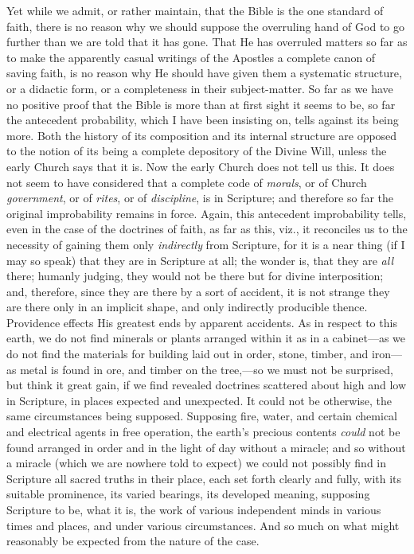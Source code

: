 Yet while we admit, or rather maintain, that the Bible is the one
standard of faith, there is no reason why we should suppose the
overruling hand of God to go further than we are told that it has
gone. That He has overruled matters so far as to make the apparently
casual writings of the Apostles a complete canon of saving faith, is
no reason why He should have given them a systematic structure, or a
didactic form, or a completeness in their subject-matter. So far as we
have no positive proof that the Bible is more than at first sight it
seems to be, so far the antecedent probability, which I have been
insisting on, tells against its being more. Both the history of its
composition and its internal structure are opposed to the notion of
its being a complete depository of the Divine Will, unless the early
Church says that it is. Now the early Church does not tell us this. It
does not seem to have considered that a complete code of \emph{morals},
or of Church \emph{government}, or of \emph{rites}, or of \emph{discipline},
is in Scripture; and therefore so far the original improbability
remains in force. Again, this antecedent improbability tells, even in
the case of the doctrines of faith, as far as this, viz., it
reconciles us to the necessity of gaining them only \emph{indirectly}
from Scripture, for it is a near thing (if I may so speak) that they
are in Scripture at all; the wonder is, that they are \emph{all} there;
humanly judging, they would not be there but for divine interposition;
and, therefore, since they are there by a sort of accident, it
is not strange they are there only in an implicit shape, and only
indirectly producible thence. Providence effects His greatest ends by
apparent accidents. As in respect to this earth, we do not find
minerals or plants arranged within it as in a cabinet—as we do not
find the materials for building laid out in order, stone, timber, and
iron—as metal is found in ore, and timber on the tree,—so we must
not be surprised, but think it great gain, if we find revealed
doctrines scattered about high and low in Scripture, in places
expected and unexpected. It could not be otherwise, the same
circumstances being supposed. Supposing fire, water, and certain
chemical and electrical agents in free operation, the earth's precious
contents \emph{could} not be found arranged in order and in the light
of day without a miracle; and so without a miracle (which we are
nowhere told to expect) we could not possibly find in Scripture all
sacred truths in their place, each set forth clearly and fully, with
its suitable prominence, its varied bearings, its developed meaning,
supposing Scripture to be, what it is, the work of various independent
minds in various times and places, and under various circumstances.
And so much on what might reasonably be expected from the nature of
the case.

